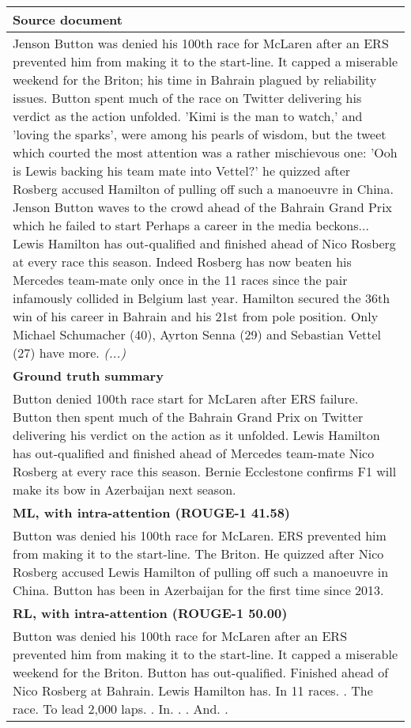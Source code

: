 \documentclass{article} \usepackage{iclr2018_arxiv,times}
\begin{document}
\begin{table*}
\begin{minipage}{\textwidth}
\vspace*{10pt}
\small
\begin{tabular}{|p{\textwidth}|}
\hline
{\bf Source document}\\\hline
Jenson Button was denied his 100th race for McLaren after an ERS prevented him from making it to the start-line. It capped a miserable weekend for the Briton; his time in Bahrain plagued by reliability issues. Button spent much of the race on Twitter delivering his verdict as the action unfolded. 'Kimi is the man to watch,' and 'loving the sparks', were among his pearls of wisdom, but the tweet which courted the most attention was a rather mischievous one: 'Ooh is Lewis backing his team mate into Vettel?' he quizzed after Rosberg accused Hamilton of pulling off such a manoeuvre in China. Jenson Button waves to the crowd ahead of the Bahrain Grand Prix which he failed to start Perhaps a career in the media beckons... Lewis Hamilton has out-qualified and finished ahead of Nico Rosberg at every race this season. Indeed Rosberg has now beaten his Mercedes team-mate only once in the 11 races since the pair infamously collided in Belgium last year. Hamilton secured the 36th win of his career in Bahrain and his 21st from pole position. Only Michael Schumacher (40), Ayrton Senna (29) and Sebastian Vettel (27) have more. \textit{(...)}\\\hline
{\bf Ground truth summary}\\\hline
Button denied 100th race start for McLaren after ERS failure. Button then spent much of the Bahrain Grand Prix on Twitter delivering his verdict on the action as it unfolded. Lewis Hamilton has out-qualified and finished ahead of Mercedes team-mate Nico Rosberg at every race this season. Bernie Ecclestone confirms F1 will make its bow in Azerbaijan next season.\\\hline
{\bf ML, with intra-attention (ROUGE-1 41.58)}\\\hline
Button was denied his 100th race for McLaren. ERS prevented him from making it to the start-line. The Briton. He quizzed after Nico Rosberg accused Lewis Hamilton of pulling off such a manoeuvre in China. Button has been in Azerbaijan for the first time since 2013. \\\hline
{\bf RL, with intra-attention (ROUGE-1 50.00) }\\\hline
Button was denied his 100th race for McLaren after an ERS prevented him from making it to the start-line. It capped a miserable weekend for the Briton. Button has out-qualified. Finished ahead of Nico Rosberg at Bahrain. Lewis Hamilton has. In 11 races. . The race. To lead 2,000 laps. . In. . . And. . \\\hline

\end{tabular}
\end{minipage}
\end{table*}
\end{document}
